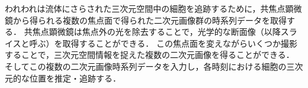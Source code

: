 
われわれは流体にさらされた三次元空間中の細胞を追跡するために，共焦点顕微鏡から得られる複数の焦点面で得られた二次元画像群の時系列データを取得する．
共焦点顕微鏡は焦点外の光を除去することで，光学的な断面像（以降スライスと呼ぶ）を取得することができる．
この焦点面を変えながらいくつか撮影することで，三次元空間情報を捉えた複数の二次元画像を得ることができる．
そしてこの複数の二次元画像時系列データを入力し，各時刻における細胞の三次元的な位置を推定・追跡する．